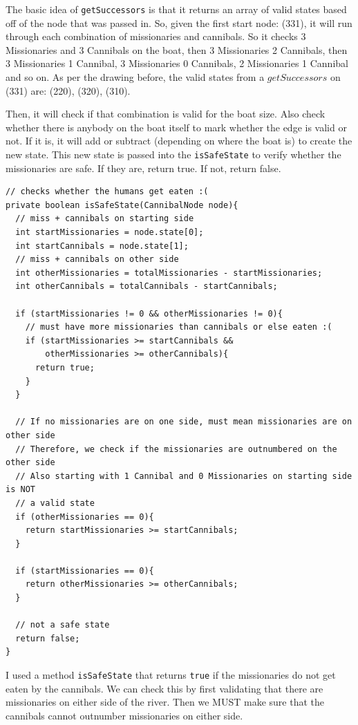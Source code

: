 \documentclass[a4paper]{report}
\begin{document}
The basic idea of \verb`getSuccessors` is that it returns an array of valid states
based off of the node that was passed in. So, given the first start node: (331), it will
run through each combination of missionaries and cannibals. So it checks 3 Missionaries and 
3 Cannibals on the boat, then 3 Missionaries 2 Cannibals, then 3 Missionaries 1 Cannibal, 
3 Missionaries 0 Cannibals, 2 Missionaries 1 Cannibal and so on. As per the drawing before,
the valid states from a $getSuccessors$ on (331) are: (220), (320), (310).

Then, it will check if 
that combination is valid for the boat size. Also check whether there is anybody on the
boat itself to mark whether the edge is valid or not. If it is, it will add or subtract (depending
on where the boat is) to create the new state. This new state is passed into the \verb`isSafeState`
to verify whether the missionaries are safe. If they are, return true. If not, return false.


\begin{lstlisting}
// checks whether the humans get eaten :(
private boolean isSafeState(CannibalNode node){
  // miss + cannibals on starting side
  int startMissionaries = node.state[0];
  int startCannibals = node.state[1];
  // miss + cannibals on other side
  int otherMissionaries = totalMissionaries - startMissionaries;
  int otherCannibals = totalCannibals - startCannibals;
  
  if (startMissionaries != 0 && otherMissionaries != 0){
    // must have more missionaries than cannibals or else eaten :(
    if (startMissionaries >= startCannibals && 
        otherMissionaries >= otherCannibals){
      return true;
    }
  }
  
  // If no missionaries are on one side, must mean missionaries are on other side
  // Therefore, we check if the missionaries are outnumbered on the other side
  // Also starting with 1 Cannibal and 0 Missionaries on starting side is NOT 
  // a valid state
  if (otherMissionaries == 0){
    return startMissionaries >= startCannibals;
  }
  
  if (startMissionaries == 0){
    return otherMissionaries >= otherCannibals;
  }
  
  // not a safe state
  return false;
}

\end{lstlisting}

I used a method \verb`isSafeState` that returns \verb`true` if the missionaries do not get
eaten by the cannibals. We can check this by first validating that there are missionaries on
either side of the river. Then we MUST make sure that the cannibals cannot outnumber
missionaries on either side. 
\end{document}
